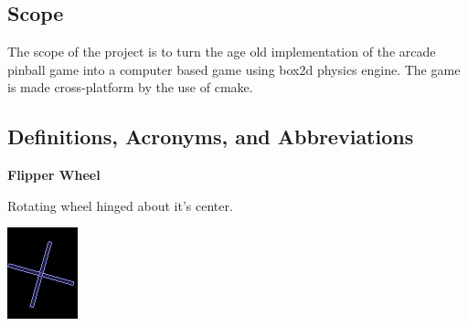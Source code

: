 \documentclass{article}
\begin{document}
    \subsection{Scope}
    The scope of the project is to turn the age old implementation of the arcade pinball game into a computer based game using box2d physics engine. The game is made cross-platform by the use of cmake.
    \subsection{Definitions, Acronyms, and Abbreviations}
    
    \textbf{Flipper Wheel}

    \begin{minipage}[t]{0.6 \textwidth}
        \vspace{0pt}
        Rotating wheel hinged about it’s center.
    \end{minipage}
    \begin{minipage}[t]{0.25\textwidth}
        \vspace{0pt}
        \centering
        \includegraphics[width=0.9\linewidth,natwidth=610,natheight=642]{flipperWheel.png} 
        \label{fig:flipperWheel}
    \end{minipage}
\end{document}
